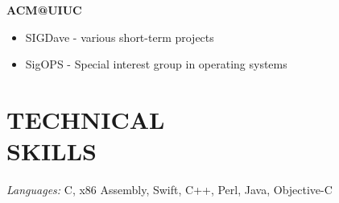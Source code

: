 \documentclass[resmargin]{res}
\begin{document}
\begin{resume}
\vspace{-5mm}
{\bf ACM@UIUC}
\begin{itemize} \itemsep -2pt
 \item SIGDave - various short-term projects
 \item SigOPS - Special interest group in operating systems
\end{itemize} 

\vspace{-3mm}
\section{TECHNICAL \\ SKILLS} {\sl Languages:} C, x86 Assembly, Swift, C++, Perl, Java, Objective-C

\end{resume}
\end{document}
